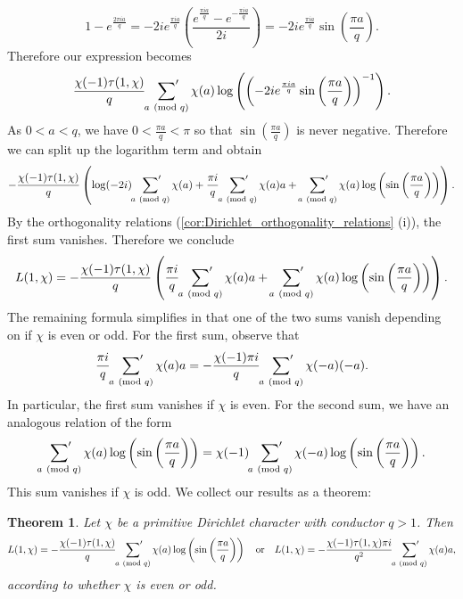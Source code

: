 \documentclass[12pt]{book}
\newtheorem{theorem}{Theorem}[section]
\theoremstyle{definition}\newframedtheorem{method}{Method}
\newcommand{\psum}{\sideset{}{'}\sum}
\newcommand{\tmod}[1]{\ \left(\text{mod }#1\right)}
\newcommand{\<}{\langle}
\renewcommand{\>}{\rangle}
\begin{document}
      \[
        1-e^{\frac{2\pi ia}{q}} = -2ie^{\frac{\pi ia}{q}}\left(\frac{e^{\frac{\pi ia}{q}}-e^{-\frac{\pi ia}{q}}}{2i}\right) = -2ie^{\frac{\pi ia}{q}}\sin\left(\frac{\pi a}{q}\right).
      \]
      Therefore our expression becomes
      \[
        \frac{\chi(-1)\tau(1,\chi)}{q}\psum_{a \tmod{q}}\chi(a)\log\left(\left(-2ie^{\frac{\pi ia}{q}}\sin\left(\frac{\pi a}{q}\right)\right)^{-1}\right).
      \]
      As $0< a < q$, we have $0 < \frac{\pi a}{q} < \pi$ so that $\sin\left(\frac{\pi a}{q}\right)$ is never negative. Therefore we can split up the logarithm term and obtain
      \[
        -\frac{\chi(-1)\tau(1,\chi)}{q}\left(\log(-2i)\psum_{a \tmod{q}}\chi(a)+\frac{\pi i}{q}\psum_{a \tmod{q}}\chi(a)a+\psum_{a \tmod{q}}\chi(a)\log\left(\sin\left(\frac{\pi a}{q}\right)\right)\right).
      \]
      By the orthogonality relations (\cref{cor:Dirichlet_orthogonality_relations} (i)), the first sum vanishes. Therefore we conclude
      \[
        L(1,\chi) = -\frac{\chi(-1)\tau(1,\chi)}{q}\left(\frac{\pi i}{q}\psum_{a \tmod{q}}\chi(a)a+\psum_{a \tmod{q}}\chi(a)\log\left(\sin\left(\frac{\pi a}{q}\right)\right)\right).
      \]
      The remaining formula simplifies in that one of the two sums vanish depending on if $\chi$ is even or odd. For the first sum, observe that
      \[
        \frac{\pi i}{q}\psum_{a \tmod{q}}\chi(a)a = -\frac{\chi(-1)\pi i}{q}\psum_{a \tmod{q}}\chi(-a)(-a).
      \]
      In particular, the first sum vanishes if $\chi$ is even. For the second sum, we have an analogous relation of the form
      \[
        \psum_{a \tmod{q}}\chi(a)\log\left(\sin\left(\frac{\pi a}{q}\right)\right) = \chi(-1)\psum_{a \tmod{q}}\chi(-a)\log\left(\sin\left(\frac{\pi a}{q}\right)\right).
      \]
      This sum vanishes if $\chi$ is odd. We collect our results as a theorem:

      \begin{theorem}\label{thm:Value_of_Dirichlet_L-functions_at_s=1}
        Let $\chi$ be a primitive Dirichlet character with conductor $q > 1$. Then
        \[
          L(1,\chi) = -\frac{\chi(-1)\tau(1,\chi)}{q}\psum_{a \tmod{q}}\chi(a)\log\left(\sin\left(\frac{\pi a}{q}\right)\right) \quad \text{or} \quad L(1,\chi) = -\frac{\chi(-1)\tau(1,\chi)\pi i}{q^{2}}\psum_{a \tmod{q}}\chi(a)a,
        \]
        according to whether $\chi$ is even or odd.
      \end{theorem}
\end{document}
